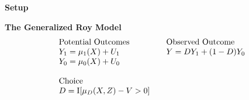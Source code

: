 \begin{frame}\begin{center}
\LARGE\textbf{Setup}
\end{center}\end{frame}
\begin{frame}\textbf{The Generalized Roy Model}
\begin{align*}\begin{array}{l@{\qquad}l}
\text{Potential Outcomes} &\text{Observed Outcome}\\
Y_1 = \mu_1(X) + U_1      &  Y = D Y_1 + (1 - D)Y_0 \\
Y_0 = \mu_0(X) + U_0      &\\
    & \\
\text{Choice} & \\
D = \mathrm{I}[\mu_D(X, Z) - V > 0] & \\
\end{array}
\end{align*}
\end{frame}

